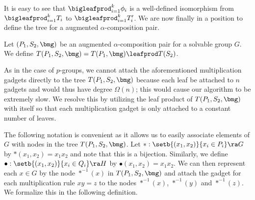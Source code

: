 
It is easy to see that $\bigleafprod_{i = 1}^k \phi_i$ is a well-defined isomorphism from $\bigleafprod_{i = 1}^k T_i$ to $\bigleafprod_{i = 1}^k T_i'$.  We are now finally in a position to define the tree for a augmented $\alpha$-composition pair.

\begin{definition}
  \label{defn:aug-comp}
  Let $(P_1, S_2, \bmg)$ be an augmented $\alpha$-composition pair for a solvable group $G$.  We define $T(P_1, S_2, \bmg) = T(P_1, \bmg) \leafprod T(S_2)$.
\end{definition}

As in the case of $p$-groups, we cannot attach the aforementioned multiplication gadgets directly to the tree $T(P_1, S_2, \bmg)$ because each leaf be attached to $n$ gadgets and would thus have degree $\Omega(n)$; this would cause our algorithm to be extremely slow.  We resolve this by utilizing the leaf product of $T(P_1, S_2, \bmg)$ with itself so that each multiplication gadget is only attached to a constant number of leaves.

The following notation is convenient as it allows us to easily associate elements of $G$ with nodes in the tree $T(P_1, S_2, \bmg)$.  Let $* : \setb{(x_1, x_2)}{x_i \in P_i} \ra G$ by $*(x_1, x_2) = x_1 x_2$ and note that this is a bijection.  Similarly, we define $\bullet : \setb{(x_1, x_2)}{x_i \in Q_i} \ra H$ by $\bullet(x_1, x_2) = x_1 x_2$.  We can then represent each $x \in G$ by the node $*^{-1}(x)$ in $T(P_1, S_2, \bmg)$ and attach the gadget for each multiplication rule $x y = z$ to the nodes $*^{-1}(x)$, $*^{-1}(y)$ and $*^{-1}(z)$.  We formalize this in the following definition.


